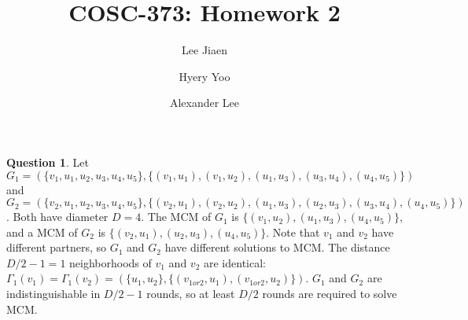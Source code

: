 \documentclass{amsart}
\title{COSC-373: Homework 2}
\author{Lee Jiaen}
\author{Hyery Yoo}
\author{Alexander Lee}
\theoremstyle{definition}
\newtheorem{question}{Question}
\begin{document}
\maketitle

\begin{question}
  Let $G_1 = (\{v_1, u_1, u_2, u_3, u_4, u_5\}, \{(v_1, u_1),(v_1, u_2),(u_1, u_3),(u_3,u_4),(u_4,u_5)\})$
  \\and $G_2 = (\{v_2, u_1, u_2, u_3, u_4, u_5\}, \{(v_2, u_1),(v_2, u_2),(u_1, u_3),(u_2, u_3),(u_3,u_4),(u_4,u_5)\})$. Both have diameter $D=4$. The MCM of $G_1$ is $\{(v_1, u_2),(u_1, u_3),(u_4,u_5)\}$, and a MCM of $G_2$ is $\{(v_2,u_1),(u_2,u_3),(u_4,u_5)\}$. Note that $v_1$ and $v_2$ have different partners, so $G_1$ and $G_2$ have different solutions to MCM. The distance $D/2-1=1$ neighborhoods of $v_1$ and $v_2$ are identical: $\Gamma_1(v_1) = \Gamma_1(v_2) = (\{u_1, u_2\},\{(v_{1 or 2}, u_1), (v_{1 or 2},u_2)\})$. $G_1$ and $G_2$ are indistinguishable in $D/2-1$ rounds, so at least $D/2$ rounds are required to solve MCM. 
\end{question}
\end{document}
